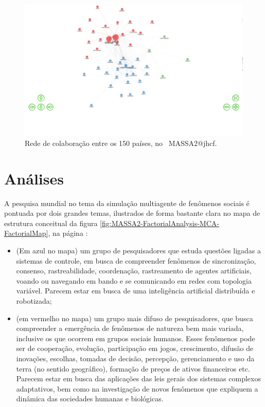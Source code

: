 \begin{figure}
    \centering
    \includegraphics[width=1\textwidth]{experiments/jhcf/PesqBibliogr/SimulacaoMultiagente/WoS-20220203/Estrutura/Social/MASSA2-Collaboration-Network-50country.png}
    \caption{Rede de colaboração entre os 150 países, no  \dataset\ MASSA2@jhcf.}
    \label{fig:MASSA2-Collaboration-Network-50country}
\end{figure}


\section{Análises\label{MASSA2:Analises}}

A pesquisa mundial no tema da simulação multiagente de fenômenos sociais é pontuada por dois grandes temas, ilustrados de forma bastante clara no mapa de estrutura conceitual da figura \ref{fig:MASSA2-FactorialAnalysis-MCA-FactorialMap}, na página \pageref{fig:MASSA2-FactorialAnalysis-MCA-FactorialMap}:
\begin{itemize}
    \item 
(Em azul no mapa) um grupo de pesquisadores que estuda questões ligadas a sistemas de controle, em busca de compreender fenômenos de sincronização, consenso, rastreabilidade, coordenação, rastreamento de agentes artificiais, voando ou navegando em bando e se comunicando em redes com topologia variável. Parecem estar em busca de uma inteligência artificial distribuída e robotizada;
\item (em vermelho no mapa) um grupo mais difuso de pesquisadores, que busca compreender a emergência de fenômenos de natureza bem mais variada, inclusive os que ocorrem em grupos sociais humanos. Esses fenômenos pode ser de cooperação, evolução, participação em jogos, crescimento, difusão de inovações, escolhas, tomadas de decisão, percepção, gerenciamento e uso da terra (no sentido geográfico), formação de preços de ativos financeiros etc. Parecem estar em busca das aplicações das leis gerais dos sistemas complexos adaptativos, bem como na investigação de novos fenômenos que expliquem a dinâmica das sociedades humanas e biológicas.
\end{itemize}

